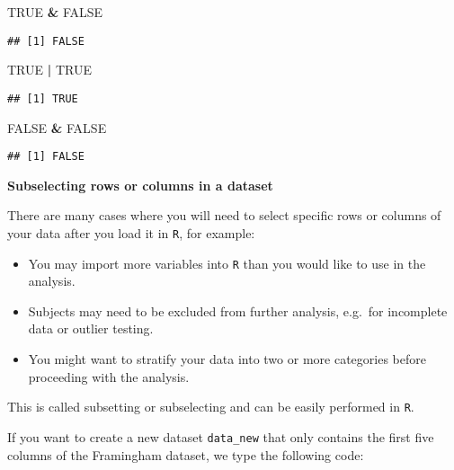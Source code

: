 \documentclass[
]{article}
\newenvironment{Shaded}{\begin{snugshade}}{\end{snugshade}}
\newcommand{\OperatorTok}[1]{\textcolor[rgb]{0.81,0.36,0.00}{\textbf{#1}}}
\newcommand{\OtherTok}[1]{\textcolor[rgb]{0.56,0.35,0.01}{#1}}
\newcommand{\StringTok}[1]{\textcolor[rgb]{0.31,0.60,0.02}{#1}}
\begin{document}
\begin{Shaded}
\begin{Highlighting}[]
\OtherTok{TRUE} \OperatorTok{&}\StringTok{ }\OtherTok{FALSE}
\end{Highlighting}
\end{Shaded}

\begin{verbatim}
## [1] FALSE
\end{verbatim}

\begin{Shaded}
\begin{Highlighting}[]
\OtherTok{TRUE} \OperatorTok{|}\StringTok{ }\OtherTok{TRUE}
\end{Highlighting}
\end{Shaded}

\begin{verbatim}
## [1] TRUE
\end{verbatim}

\begin{Shaded}
\begin{Highlighting}[]
\OtherTok{FALSE} \OperatorTok{&}\StringTok{ }\OtherTok{FALSE}
\end{Highlighting}
\end{Shaded}

\begin{verbatim}
## [1] FALSE
\end{verbatim}

\textbf{Subselecting rows or columns in a dataset}

There are many cases where you will need to select specific rows or
columns of your data after you load it in \texttt{R}, for example:

\begin{itemize}
\item
  You may import more variables into \texttt{R} than you would like to
  use in the analysis.
\item
  Subjects may need to be excluded from further analysis, e.g.~for
  incomplete data or outlier testing.
\item
  You might want to stratify your data into two or more categories
  before proceeding with the analysis.
\end{itemize}

This is called subsetting or subselecting and can be easily performed in
\texttt{R}.

If you want to create a new dataset \texttt{data\_new} that only
contains the first five columns of the Framingham dataset, we type the
following code:
\end{document}
